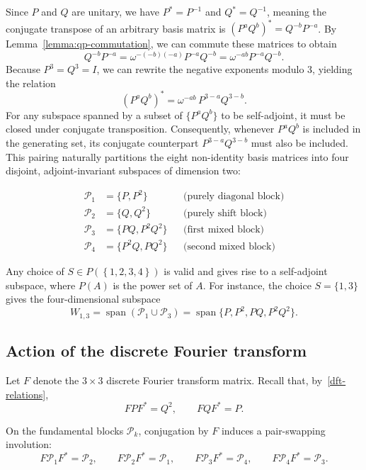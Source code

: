 Since \( P \) and \( Q \) are unitary, we have \( P^* = P^{-1} \) and
\( Q^* = Q^{-1} \), meaning the conjugate transpose of an arbitrary
basis matrix is \( (P^aQ^b)^* = Q^{-b}P^{-a} \). By
Lemma~\ref{lemma:qp-commutation}, we can commute these matrices to obtain
\[
    Q^{-b}P^{-a} = \omega^{-(-b)(-a)} P^{-a}Q^{-b} = \omega^{-ab} P^{-a}Q^{-b}.
\]
Because \( P^3 = Q^3 = I \), we can rewrite the negative exponents
modulo 3, yielding the relation
\[
    (P^aQ^b)^* = \omega^{-ab}\, P^{3-a}Q^{3-b}.
\]
For any subspace spanned by a subset of \( \{P^aQ^b\} \) to be
self-adjoint, it must be closed under conjugate transposition.
Consequently, whenever \( P^aQ^b \) is included in the generating
set, its conjugate counterpart \( P^{3-a}Q^{3-b} \) must also be
included. This pairing naturally partitions the eight non-identity
basis matrices into four disjoint, adjoint-invariant subspaces of dimension two:

\begin{align*}
    \mathcal{P}_1 &= \{P, P^2\} && \text{(purely diagonal block)} \\
    \mathcal{P}_2 &= \{Q, Q^2\} && \text{(purely shift block)} \\
    \mathcal{P}_3 &= \{PQ, P^2Q^2\} && \text{(first mixed block)} \\
    \mathcal{P}_4 &= \{P^2Q, PQ^2\} && \text{(second mixed block)}
\end{align*}

Any choice of \( S \in P(\left\{ 1, 2, 3, 4 \right\}) \) is valid
and gives rise to a self-adjoint subspace, where \( P(A) \) is the
power set of \( A \).
For instance, the choice \( S = \{1,3\} \) gives the four-dimensional
subspace
\[
    W_{1,3}= \operatorname{span}(\mathcal{P}_1 \cup \mathcal{P}_3 ) =
    \operatorname{span}\{P, P^2, PQ, P^2Q^2\}.
\]

\subsection{Action of the discrete Fourier transform}
\label{subsec:dft-action-m3}

Let \( F \) denote the \( 3 \times 3 \) discrete Fourier transform
matrix. Recall that, by~\ref{dft-relations},
\[
    FPF^* = Q^2, \qquad FQF^* = P.
\]

\begin{lemma}
    \label{lemma:dft-block-swap}
    On the fundamental blocks \( \mathcal{P}_k \), conjugation by
    \( F \) induces a pair-swapping involution:
    \[
        F\mathcal{P}_1F^* = \mathcal{P}_2, \qquad
        F\mathcal{P}_2F^* = \mathcal{P}_1, \qquad
        F\mathcal{P}_3F^* = \mathcal{P}_4, \qquad
        F\mathcal{P}_4F^* = \mathcal{P}_3.
    \]
\end{lemma}

